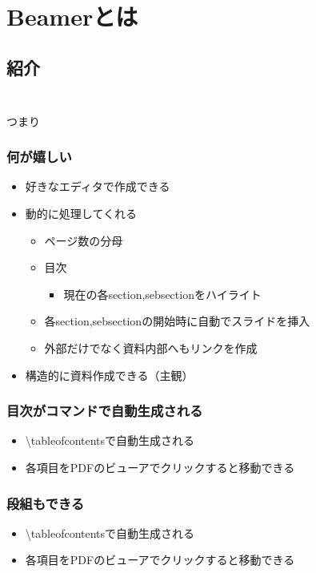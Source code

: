 \section{Beamerとは}
\subsection{紹介}
\begin{frame}
    \frametitle{\insertsection}
    \beameris
    \bigskip
    \\つまり
\end{frame}

\begin{frame}
    \frametitle{何が嬉しい}
    \begin{itemize}
        \item 好きなエディタで作成できる
        \item 動的に処理してくれる
        \begin{itemize}
            \item ページ数の分母
            \item 目次
            \begin{itemize}
                \item 現在の各section,sebsectionをハイライト
            \end{itemize}
            \item 各section,sebsectionの開始時に自動でスライドを挿入
            \item 外部だけでなく資料内部へもリンクを作成
        \end{itemize}
        \item 構造的に資料作成できる（主観）
    \end{itemize}
\end{frame}

\begin{frame}
  \frametitle{目次がコマンドで自動生成される}
  \tableofcontents
  \bigskip
  \footnotesize
  \begin{itemize}
      \item \textbackslash tableofcontentsで自動生成される
      \item 各項目をPDFのビューアでクリックすると移動できる
  \end{itemize}
\end{frame}

\begin{frame}
  \frametitle{段組もできる}
    \begin{multicols}{2}
      \tableofcontents[sections={1}]
      \columnbreak
      \tableofcontents[sections={2-3}]
    \end{multicols}
    \bigskip
    \footnotesize
    \begin{itemize}
        \item \textbackslash tableofcontentsで自動生成される
        \item 各項目をPDFのビューアでクリックすると移動できる
    \end{itemize}
\end{frame}

